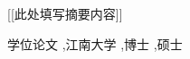 \jnabstract[zh]   %

[[此处填写摘要内容]]



\begin{jnkeywords}
学位论文 \sep 江南大学 \sep 博士 \sep 硕士
\end{jnkeywords}

